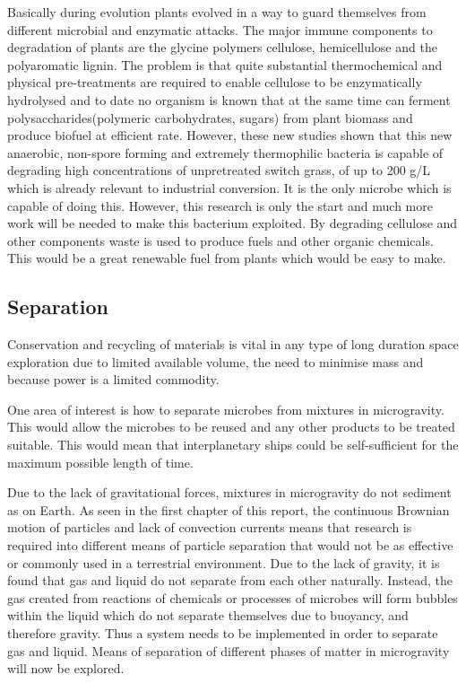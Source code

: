 \documentclass[12pt]{article}
\begin{document}
Basically during evolution plants evolved in a way to guard themselves from different
microbial and enzymatic attacks. The major immune components to degradation of plants are
the glycine polymers cellulose, hemicellulose and the polyaromatic lignin. The problem is that
quite substantial thermochemical and physical pre-treatments are required to enable cellulose to
be enzymatically hydrolysed and to date no organism is known that at the same time can
ferment polysaccharides(polymeric carbohydrates, sugars) from plant biomass and produce
biofuel at efficient rate. However, these new studies shown that this new anaerobic, non-spore
forming and extremely thermophilic bacteria is capable of degrading high concentrations of
unpretreated switch grass, of up to 200 g/L which is already relevant to industrial conversion. It
is the only microbe which is capable of doing this. However, this research is only the start and much more work will be needed to make this bacterium exploited. By degrading cellulose and
other components waste is used to produce fuels and other organic chemicals. This would be a
great renewable fuel from plants which would be easy to make.

\subsection{Separation}
Conservation and recycling of materials is vital in any type of long duration space exploration due to limited available volume, the need to minimise mass and because power is a limited commodity. 

One area of interest is how to separate microbes from mixtures in microgravity. This would allow the microbes to be reused and any other products to be treated suitable. This would mean that interplanetary ships could be self-sufficient for the maximum possible length of time.

Due to the lack of gravitational forces, mixtures in microgravity do not sediment as on Earth. As seen in the first chapter of this report, the continuous Brownian motion of particles and lack of convection currents means that research is required into different means of particle separation that would not be as effective or commonly used in a terrestrial environment. Due to the lack of gravity, it is found that gas and liquid do not separate from each other naturally. Instead, the gas created from reactions of chemicals or processes of microbes will form bubbles within the liquid which do not separate themselves due to buoyancy, and therefore gravity. Thus a system needs to be implemented in order to separate gas and liquid. Means of separation of different phases of matter in microgravity will now be explored.
\end{document}
